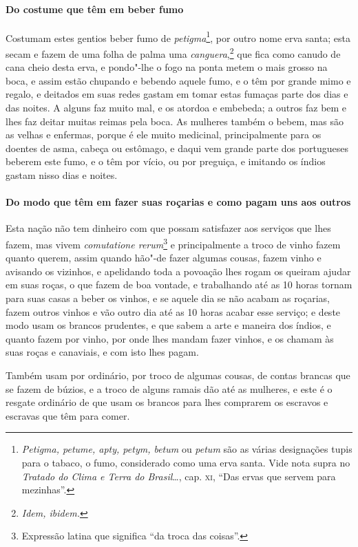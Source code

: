 \paragraph{Do costume que têm em beber fumo}

Costumam estes gentios beber fumo de \textit{petigma}\footnote{ \textit{Petigma, 
petume, apty, petym, betum} ou \textit{petum} são as várias designações tupis para o tabaco, o fumo,
considerado como uma erva santa. Vide nota supra no \textit{Tratado do
Clima e Terra do Brasil}\ldots, cap. \textsc{xi}, ``Das ervas que servem
para mezinhas''.}, por outro nome erva santa; esta
secam e fazem de uma folha de palma uma \textit{canguera},\footnote{ \textit{Idem, ibidem.}} 
que fica como canudo de cana cheio desta erva, e pondo"-lhe o fogo na ponta metem o mais grosso na boca, e
assim estão chupando e bebendo aquele fumo, e o têm por grande mimo e
regalo, e deitados em suas redes gastam em tomar estas fumaças parte
dos dias e das noites. A alguns faz muito mal, e os atordoa e embebeda;
a outros faz bem e lhes faz deitar muitas reimas pela boca. As mulheres
também o bebem, mas são as velhas e enfermas, porque é ele muito
medicinal, principalmente para os doentes de asma, cabeça ou estômago,
e daqui vem grande parte dos portugueses beberem este fumo, e o têm por
vício, ou por preguiça, e imitando os índios gastam nisso dias e noites.

\paragraph{Do modo que têm em fazer suas roçarias e como pagam uns aos outros}

Esta nação não tem dinheiro com que possam satisfazer aos
serviços que lhes fazem, mas vivem \textit{comutatione rerum}\footnote{ Expressão latina que significa ``da troca das coisas''.} e
principalmente a troco de vinho fazem quanto querem, assim quando
hão"-de fazer algumas cousas, fazem vinho e avisando os vizinhos, e
apelidando toda a povoação lhes rogam os queiram ajudar em suas roças,
o que fazem de boa vontade, e trabalhando até as 10 horas tornam para
suas casas a beber os vinhos, e se aquele dia se não acabam as
roçarias, fazem outros vinhos e vão outro dia até as 10 horas acabar
esse serviço; e deste modo usam os brancos prudentes, e que sabem a
arte e maneira dos índios, e quanto fazem por vinho, por onde lhes
mandam fazer vinhos, e os chamam às suas roças e canaviais, e com isto lhes pagam.

 Também usam por ordinário, por troco de algumas cousas, de contas
brancas que se fazem de búzios, e a troco de alguns ramais dão até as
mulheres, e este é o resgate ordinário de que usam os brancos para lhes
comprarem os escravos e escravas que têm para comer.

